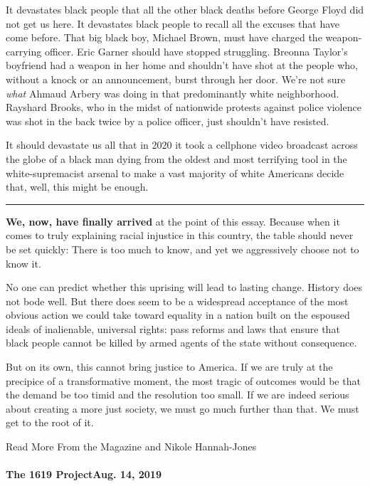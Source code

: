 It devastates black people that all the other black deaths before George
Floyd did not get us here. It devastates black people to recall all the
excuses that have come before. That big black boy, Michael Brown, must
have charged the weapon-carrying officer. Eric Garner should have
stopped struggling. Breonna Taylor's boyfriend had a weapon in her home
and shouldn't have shot at the people who, without a knock or an
announcement, burst through her door. We're not sure \emph{what} Ahmaud
Arbery was doing in that predominantly white neighborhood. Rayshard
Brooks, who in the midst of nationwide protests against police violence
was shot in the back twice by a police officer, just shouldn't have
resisted.

It should devastate us all that in 2020 it took a cellphone video
broadcast across the globe of a black man dying from the oldest and most
terrifying tool in the white-supremacist arsenal to make a vast majority
of white Americans decide that, well, this might be enough.

\begin{center}\rule{0.5\linewidth}{\linethickness}\end{center}

\textbf{We, now, have finally arrived} at the point of this essay.
Because when it comes to truly explaining racial injustice in this
country, the table should never be set quickly: There is too much to
know, and yet we aggressively choose not to know it.

No one can predict whether this uprising will lead to lasting change.
History does not bode well. But there does seem to be a widespread
acceptance of the most obvious action we could take toward equality in a
nation built on the espoused ideals of inalienable, universal rights:
pass reforms and laws that ensure that black people cannot be killed by
armed agents of the state without consequence.

But on its own, this cannot bring justice to America. If we are truly at
the precipice of a transformative moment, the most tragic of outcomes
would be that the demand be too timid and the resolution too small. If
we are indeed serious about creating a more just society, we must go
much further than that. We must get to the root of it.

Read More From the Magazine and Nikole Hannah-Jones

\href{https://www.nytimes3xbfgragh.onion/interactive/2019/08/14/magazine/1619-america-slavery.html}{}

\hypertarget{the-1619-projectaug-14-2019}{%
\paragraph{The 1619 ProjectAug. 14,
2019}\label{the-1619-projectaug-14-2019}}

